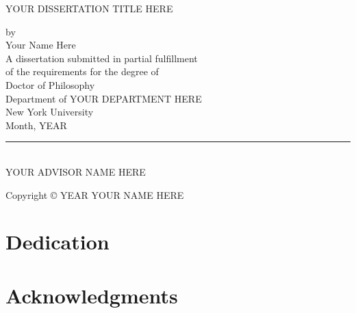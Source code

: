 \documentclass[12pt,letterpaper,oneside,final]{memoir}
\begin{document}
\fussy
{} %
\frontmatter
\hyphenation{}

\DoubleSpacing

\begin{center}

\thispagestyle{empty}
YOUR DISSERTATION TITLE HERE


\vspace{20mm}
by\\
\vspace{10mm}
Your Name Here\\
\vspace{10mm}
A dissertation submitted in partial fulfillment\\
of the requirements for the degree of\\
Doctor of Philosophy\\
Department of YOUR DEPARTMENT HERE\\
New York University\\
Month, YEAR
\end{center}
\vspace{35mm}
\begin{flushright}
{\rule[0pt]{45mm}{0.1mm}}\\ %

YOUR ADVISOR NAME HERE
\end{flushright}

\newpage

\thispagestyle{empty}

\begin{center} Copyright © YEAR YOUR NAME HERE \end{center}

\newpage

\thispagestyle{empty}

\chapter{Dedication}
\SingleSpacing

\DoubleSpacing

\newpage

\chapter{Acknowledgments}
\end{document}
